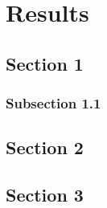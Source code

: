\chapter{Results}

\section{Section 1}

\subsection{Subsection 1.1}

\section{Section 2}

\section{Section 3}